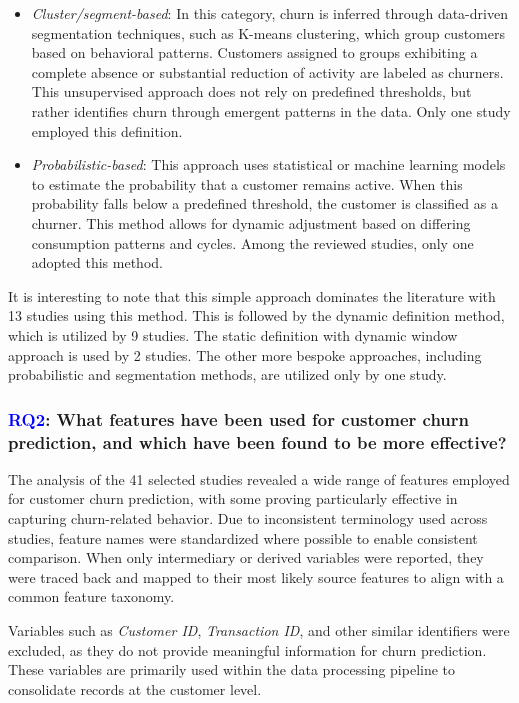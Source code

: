\documentclass[preprint,12pt]{elsarticle}
\newcommand{\RQlabel}[1]{\textcolor{blue}{#1}}
\newcommand{\RSRQtwo}{\RQlabel{RQ2}: What features have been used for customer churn prediction, and which have been found to be more effective?}
\begin{document}
\begin{itemize}
    \item \textit{Cluster/segment-based}: In this category, churn is inferred through data-driven segmentation techniques, such as K-means clustering, which group customers based on behavioral patterns. Customers assigned to groups exhibiting a complete absence or substantial reduction of activity are labeled as churners. This unsupervised approach does not rely on predefined thresholds, but rather identifies churn through emergent patterns in the data. Only one study employed this definition.
     
    \item \textit{Probabilistic-based}: This approach uses statistical or machine learning models to estimate the probability that a customer remains active. When this probability falls below a predefined threshold, the customer is classified as a churner. This method allows for dynamic adjustment based on differing consumption patterns and cycles. Among the reviewed studies, only one adopted this method.

\end{itemize}



It is interesting to note that this simple approach dominates the literature with 13 studies using this method. This is followed by the dynamic definition method, which is utilized by 9 studies. The static definition with dynamic window approach is used by 2 studies. The other more bespoke approaches, including probabilistic and segmentation methods, are utilized only by one study.

\subsubsection{\RSRQtwo}
\label{sec:RQ2}
The analysis of the 41 selected studies revealed a wide range of features employed for customer churn prediction,  with some proving particularly effective in capturing churn-related behavior. Due to inconsistent terminology used across studies, feature names were standardized where possible to enable consistent comparison. When only intermediary or derived variables were reported, they were traced back and mapped to their most likely source features to align with a common feature taxonomy.

Variables such as \textit{Customer ID}, \textit{Transaction ID}, and other similar identifiers were excluded, as they do not provide meaningful information for churn prediction. These variables are primarily used within the data processing pipeline to consolidate records at the customer level.
\end{document}

